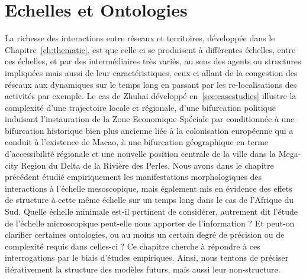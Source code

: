 





\chapter{Echelles et Ontologies}

\label{ch:micro} %





\bigskip



La richesse des interactions entre réseaux et territoires, développée dans le Chapitre~\ref{ch:thematic}, est que celle-ci se produisent à différentes échelles, entre ces échelles, et par des intermédiaires très variés, au sens des agents ou structures impliquées mais aussi de leur caractéristiques, ceux-ci allant de la congestion des réseaux aux dynamiques sur le temps long en passant par les re-localisations des activités par exemple. Le cas de Zhuhai développé en~\ref{sec:casestudies} illustre la complexité d'une trajectoire locale et régionale, d'une bifurcation politique induisant l'instauration de la Zone Economique Spéciale par  conditionnée à une bifurcation historique bien plus ancienne liée à la colonisation européenne qui a conduit à l'existence de Macao, à une bifurcation géographique en terme d'accessibilité régionale et une nouvelle position centrale de la ville dans la Mega-city Region du Delta de la Rivière des Perles. Nous avons dans le chapitre précédent étudié empiriquement les manifestations morphologiques des interactions à l'échelle mesoscopique, mais également mis en évidence des effets de structure à cette même échelle sur un temps long dans le cas de l'Afrique du Sud. Quelle échelle minimale est-il pertinent de considérer, autrement dit l'étude de l'échelle microscopique peut-elle nous apporter de l'information ? Et peut-on clarifier certaines ontologies, ou au moins un certain degré de précision ou de complexité requis dans celles-ci ? Ce chapitre cherche à répondre à ces interrogations par le biais d'études empiriques. Ainsi, nous tentons de préciser itérativement la structure des modèles futurs, mais aussi leur non-structure.


